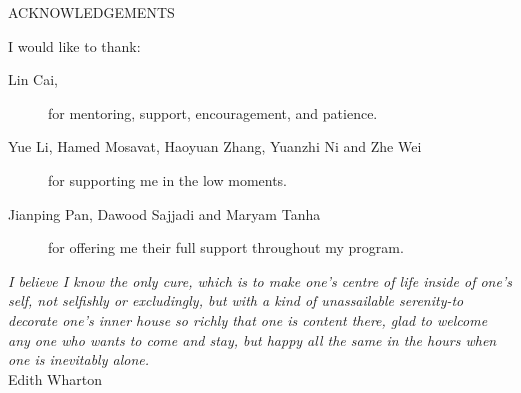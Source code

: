 \newpage
{}

\begin{center}
ACKNOWLEDGEMENTS
\end{center}

\noindent I would like to thank:
\begin{description}
\item[Lin Cai,]
	for  mentoring, support, encouragement, and patience. 
\item[Yue Li, Hamed Mosavat, Haoyuan Zhang, Yuanzhi Ni and Zhe Wei]
	for supporting me in the low moments.
\item[Jianping Pan, Dawood Sajjadi and Maryam Tanha]
	for offering me their full support throughout my program.
\end{description}

\begin{flushright}
\textit{I believe I know the only cure, which is to make
one's centre of life inside of one's self, not
selfishly or excludingly, but with a kind of
unassailable serenity-to decorate one's inner house
so richly that one is content there, glad to welcome
any one who wants to come and stay, but happy all
the same in the hours when one is inevitably alone.}
\\
Edith Wharton \\
\end{flushright}
